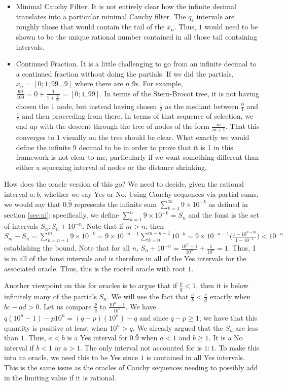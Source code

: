 \documentclass[12pt]{article}
\begin{document}
\begin{itemize}
    \item Minimal Cauchy Filter. It is not entirely clear how the infinite decimal translates into a particular minimal Cauchy filter. The $q_{\varepsilon}$ intervals are roughly those that would contain the tail of the $x_n$. Thus, $1$ would need to be shown to be the unique rational number contained in all those tail containing intervals.
    \item Continued Fraction. It is a little challenging to go from an infinite decimal to a continued fraction without doing the partials. If we did the partials, $x_n = [0; 1, 99\ldots9]$ where there are $n$ 9s.  For example, $\frac{99}{100} = 0 + \frac{1}{1 + \frac{1}{99}} = [0; 1, 99]$. In terms of the Stern-Brocot tree, it is not having chosen the $1$ node, but instead having chosen $\frac{1}{2}$ as the mediant between $\frac{0}{1}$ and $\frac{1}{1}$ and then proceeding from there. In terms of that sequence of selection, we end up with the descent through the tree of nodes of the form $\frac{m}{m+1}$. That this converges to $1$ visually on the tree should be clear. What exactly we would define the infinite 9 decimal to be in order to prove that it is 1 in this framework is not clear to me, particularly if we want something different than either a squeezing interval of nodes or the distance shrinking. 
\end{itemize}

How does the oracle version of this go?  We need to decide, given the rational interval $a:b$, whether we say Yes or No. Using Cauchy sequences via partial sums, we would say that $0.\bar{9}$ represents the infinite sum $\sum_{k=1}^{\infty} 9\times 10^{-k}$ as defined in section \ref{sec:ni}; specifically, we define $\sum_{k=1}^n 9 \times 10^{-k} =S_n$ and the fonsi is the set of intervals $S_n : S_n + 10^{-n}$. Note that if $m> n$, then $S_m - S_n = \sum_{k=n+1}^m 9 \times 10^{-k} =  9 \times 10^{-n-1} \sum_{k=0}^{m-n-1} 10^{-k} =  9\times 10^{-n-1} \big( \frac{1-10^{n-m}}{1- 10^{-1}} \big)< 10^{-n}$ establishing the bound. Note that for all $n$, $S_n + 10^{-n} =  \frac{10^{n} - 1}{10^{n}} + \frac{1}{10^{n}} = 1$. Thus, 1 is in all of the fonsi intervals and is therefore in all of the Yes intervals for the associated oracle. Thus, this is the rooted oracle with root $1$. 

Another viewpoint on this for oracles is to argue that if $\frac{p}{q} < 1$, then it is below infinitely many of the partials $S_n$. We will use the fact that $\frac{a}{b} < \frac{c}{d}$ exactly when $bc - ad > 0$.  Let us compare $\frac{p}{q}$ to $\frac{10^n - 1}{10^{n}} $. We have $ q (10^n - 1) - p 10^{n} = (q-p)(10^n) -q $ and since $q - p \geq 1$, we have that this quantity is positive at least when $10^n > q$. We already argued that the $S_n$ are less than $1$. Thus, $a\lt b$ is a Yes interval for $0.\bar{9}$ when $a< 1$ and $b\geq 1$. It is a No interval if $b< 1$ or $a > 1$. The only interval not accounted for is $1:1$. To make this into an oracle, we need this to be Yes since $1$ is contained in all Yes intervals. This is the same issue as the oracles of Cauchy sequences needing to possibly add in the limiting value if it is rational. 
 
\end{document}
